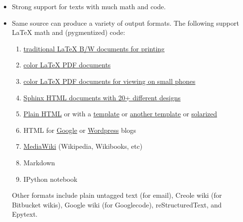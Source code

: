 \documentclass[%
oneside,                 %
final,                   %
10pt]{article}
\begin{document}
\begin{itemize}
 \item Strong support for texts with much math and code.

 \item Same source can produce a variety of output formats.
   The following support {\LaTeX} math and (pygmentized) code:
\begin{enumerate}

  \item \href{{http://hplgit.github.com/teamods/writing_reports/_static/report_4printing.pdf}}{traditional {\LaTeX} B/W documents for printing}

  \item \href{{http://hplgit.github.com/teamods/writing_reports/_static/report.pdf}}{color {\LaTeX} PDF documents}

  \item \href{{http://hplgit.github.com/teamods/writing_reports/_static/report_4phone.pdf}}{color {\LaTeX} PDF documents for viewing on small phones}

  \item \href{{http://hplgit.github.com/teamods/writing_reports/_static/sphinx-fenics_minimal/report.html}}{Sphinx HTML documents with 20+ different designs}

  \item \href{{http://hplgit.github.com/teamods/writing_reports/_static/report.html}}{Plain HTML} or with a \href{{http://hplgit.github.com/teamods/writing_reports/_static/report_vagrant.html}}{template} or \href{{http://hplgit.github.com/teamods/writing_reports/_static/report_github_minimal.html}}{another template} or \href{{http://hplgit.github.com/teamods/writing_reports/_static/report_solarized.html}}{solarized}

  \item HTML for \href{{http://doconce-report-demo.blogspot.no/}}{Google} or \href{{http://doconcereportdemo.wordpress.com/}}{Wordpress} blogs

  \item \href{{http://doconcedemo.shoutwiki.com/wiki/Doconce_demo_page}}{MediaWiki} (Wikipedia, Wikibooks, etc)

  \item Markdown

  \item IPython notebook
\end{enumerate}

\noindent
   Other formats include plain untagged text (for email),
   Creole wiki (for Bitbucket wikis), Google wiki (for Googlecode),
   reStructuredText, and Epytext.


\end{itemize}
\end{document}

